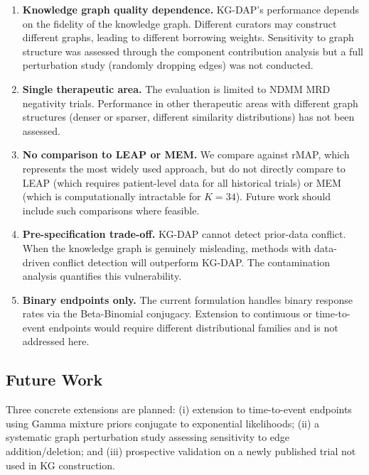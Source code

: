 \documentclass[12pt]{article}
\begin{document}
\begin{enumerate}
\item \textbf{Knowledge graph quality dependence.} KG-DAP's performance depends on the fidelity of the knowledge graph. Different curators may construct different graphs, leading to different borrowing weights. Sensitivity to graph structure was assessed through the component contribution analysis but a full perturbation study (randomly dropping edges) was not conducted.

\item \textbf{Single therapeutic area.} The evaluation is limited to NDMM MRD negativity trials. Performance in other therapeutic areas with different graph structures (denser or sparser, different similarity distributions) has not been assessed.

\item \textbf{No comparison to LEAP or MEM.} We compare against rMAP, which represents the most widely used approach, but do not directly compare to LEAP (which requires patient-level data for all historical trials) or MEM (which is computationally intractable for $K = 34$). Future work should include such comparisons where feasible.

\item \textbf{Pre-specification trade-off.} KG-DAP cannot detect prior-data conflict. When the knowledge graph is genuinely misleading, methods with data-driven conflict detection will outperform KG-DAP. The contamination analysis quantifies this vulnerability.

\item \textbf{Binary endpoints only.} The current formulation handles binary response rates via the Beta-Binomial conjugacy. Extension to continuous or time-to-event endpoints would require different distributional families and is not addressed here.
\end{enumerate}

\subsection{Future Work}

Three concrete extensions are planned: (i) extension to time-to-event endpoints using Gamma mixture priors conjugate to exponential likelihoods; (ii) a systematic graph perturbation study assessing sensitivity to edge addition/deletion; and (iii) prospective validation on a newly published trial not used in KG construction.

\appendix
\end{document}
